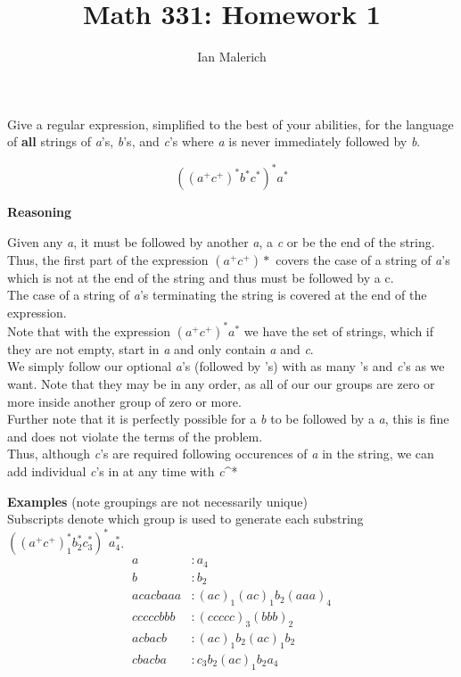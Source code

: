 \documentclass[12pt]{jhwhw}
\author{Ian Malerich}
\title{Math 331: Homework 1}
\begin{document}
\raggedright{}

\problem{}

	Give a regular expression, simplified to the best of your abilities, for the language of \textbf{all} strings
	of \textit{a}'s, \textit{b}'s, and \textit{c}'s where \textit{a} is never immediately followed by \textit{b}.

\solution



	$$
		(
		(a^+c^+)^*
		b^*c^*
		)^*a^*
	$$

	\textbf{Reasoning}

	Given any \textit{a}, it must be followed by another \textit{a}, a \textit{c} or be the end of the string.
	Thus, the first part of the expression $(a^+c^+)*$ covers the case of a string of \textit{a}'s which
	is not at the end of the string and thus must be followed by a c.
	\\
	The case of a string of \textit{a}'s terminating the string is covered at the end of the expression.
	\\
	Note that with the expression $(a^+c^+)^*a^*$ we have the set of strings, which if they are not empty,
	start in \textit{a} and only contain \textit{a} and \textit{c}.
	\\
	We simply follow our optional \textit{a}'s (followed by 's) with as many 's and 
	\textit{c}'s as we want. Note that they may be in any order, as all of our our groups are zero or more
	inside another group of zero or more.
	\\
	Further note that it is perfectly possible for a \textit{b} to be followed by a \textit{a}, this is fine
	and does not violate the terms of the problem.
	\\
	Thus, although \textit{c}'s are required following occurences of \textit{a} in the string, we can add
	individual \textit{c}'s in at any time with \textit{c}^*

	\bigbreak
	\textbf{Examples} (note groupings are not necessarily unique) \\
	Subscripts denote which group is used to generate each substring $((a^+c^+)_1^*b^*_2c^*_3)^*a^*_4$. \\
	\begin{align*}
		a &: a_4 \\
		b &: b_2 \\
		acacbaaa &: (ac)_1(ac)_1b_2(aaa)_4 \\
		cccccbbb &: (ccccc)_3(bbb)_2 \\
		acbacb &: (ac)_1b_2(ac)_1b_2 \\
		cbacba &: c_3b_2(ac)_1b_2a_4 \\
	\end{align*}
\end{document}
